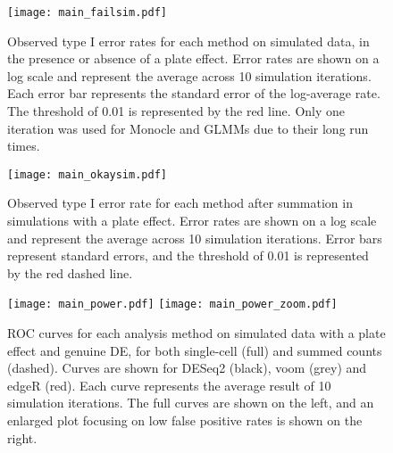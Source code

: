 \documentclass[oupdraft]{bio}
\begin{document}



\begin{figure}[!p]
\begin{center}
\texttt{[image: main\_failsim.pdf]}
\end{center}
\caption{
    Observed type I error rates for each method on simulated data, in the presence or absence of a plate effect.
    Error rates are shown on a log scale and represent the average across 10 simulation iterations.
    Each error bar represents the standard error of the log-average rate.
    The threshold of 0.01 is represented by the red line.
    Only one iteration was used for Monocle and GLMMs due to their long run times.
}
\label{fig:platefail}
\end{figure}

\begin{figure}[!p]
\begin{center}
\texttt{[image: main\_okaysim.pdf]}
\end{center}
\caption{
    Observed type I error rate for each method after summation in simulations with  a plate effect.
    Error rates are shown on a log scale and represent the average across 10 simulation iterations.
    Error bars represent standard errors, and the threshold of 0.01 is represented by the red dashed line.
}
\label{fig:platesum}
\end{figure}

\begin{figure}[!p]
\begin{center}
\texttt{[image: main\_power.pdf]}
\texttt{[image: main\_power\_zoom.pdf]}
\end{center}
\caption{
    ROC curves for each analysis method on simulated data with a plate effect and genuine DE, for both single-cell (full) and summed counts (dashed).
    Curves are shown for DESeq2 (black), voom (grey) and  edgeR (red).
    Each curve represents the average result of 10 simulation iterations.
    The full curves are shown on the left, and an enlarged plot focusing on low false positive rates is shown on the right.
}
\label{fig:roc}
\end{figure}
\end{document}
